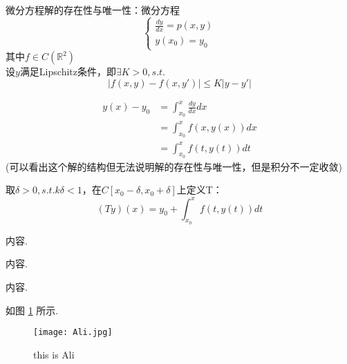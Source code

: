 \begin{problem}
微分方程解的存在性与唯一性：微分方程\begin{equation*}
    \left\{\begin{matrix}
        \frac{dy}{dx}=p(x,y) \\
        y(x_0)=y_0
    \end{matrix}\right.
\end{equation*}
其中$f\in C(\mathbb{R}^2)$\\
设$y$满足Lipschitz条件，即$\exists K>0,s.t.$\begin{equation*}
    \left | f(x,y)-f(x,y')\right | \leqslant K\left | y-y'\right |
\end{equation*}
\end{problem}

\begin{solution}
    \begin{align*}
        y(x)-y_0 & =\int_{x_0}^{x}\frac{dy}{dx}dx \\
                 & =\int_{x_0}^{x}f(x,y(x))dx     \\
                 & =\int_{x_0}^{x}f(t,y(t))dt
    \end{align*}
    (可以看出这个解的结构但无法说明解的存在性与唯一性，但是积分不一定收敛)

    取$\delta >0,s.t. k\delta <1$，在$C[x_0-\delta,x_0+\delta]$上定义T：\begin{equation*}
        (Ty)(x)=y_0+\int_{x_0}^{x}f(t,y(t))dt
    \end{equation*}
\end{solution}

\begin{property}[(有界性)]
    内容.
\end{property}

\begin{lemma}
    内容.
\end{lemma}

\begin{corollary}
    内容.
\end{corollary}

如图 \ref{1} 所示.

\begin{figure}[htbp]
    \centering %
    \texttt{[image: Ali.jpg]} %
    \caption{this is Ali} %
    \label{1} %
\end{figure}

